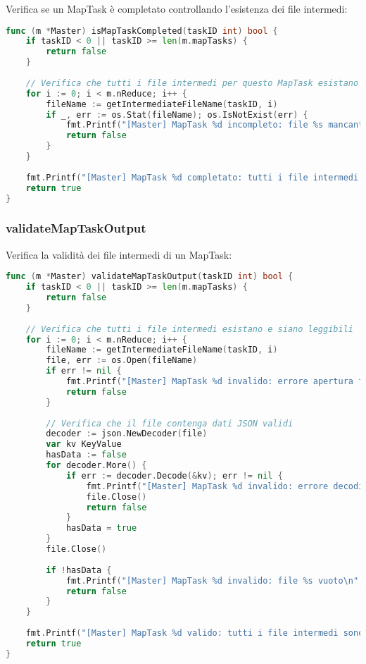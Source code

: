 \documentclass[12pt,a4paper]{article}
\begin{document}
Verifica se un MapTask è completato controllando l'esistenza dei file intermedi:

\begin{lstlisting}[language=go]
func (m *Master) isMapTaskCompleted(taskID int) bool {
    if taskID < 0 || taskID >= len(m.mapTasks) {
        return false
    }
    
    // Verifica che tutti i file intermedi per questo MapTask esistano
    for i := 0; i < m.nReduce; i++ {
        fileName := getIntermediateFileName(taskID, i)
        if _, err := os.Stat(fileName); os.IsNotExist(err) {
            fmt.Printf("[Master] MapTask %d incompleto: file %s mancante\n", taskID, fileName)
            return false
        }
    }
    
    fmt.Printf("[Master] MapTask %d completato: tutti i file intermedi presenti\n", taskID)
    return true
}
\end{lstlisting}

\subsubsection{validateMapTaskOutput}

Verifica la validità dei file intermedi di un MapTask:

\begin{lstlisting}[language=go]
func (m *Master) validateMapTaskOutput(taskID int) bool {
    if taskID < 0 || taskID >= len(m.mapTasks) {
        return false
    }
    
    // Verifica che tutti i file intermedi esistano e siano leggibili
    for i := 0; i < m.nReduce; i++ {
        fileName := getIntermediateFileName(taskID, i)
        file, err := os.Open(fileName)
        if err != nil {
            fmt.Printf("[Master] MapTask %d invalido: errore apertura file %s: %v\n", taskID, fileName, err)
            return false
        }
        
        // Verifica che il file contenga dati JSON validi
        decoder := json.NewDecoder(file)
        var kv KeyValue
        hasData := false
        for decoder.More() {
            if err := decoder.Decode(&kv); err != nil {
                fmt.Printf("[Master] MapTask %d invalido: errore decodifica JSON in %s: %v\n", taskID, fileName, err)
                file.Close()
                return false
            }
            hasData = true
        }
        file.Close()
        
        if !hasData {
            fmt.Printf("[Master] MapTask %d invalido: file %s vuoto\n", taskID, fileName)
            return false
        }
    }
    
    fmt.Printf("[Master] MapTask %d valido: tutti i file intermedi sono validi\n", taskID)
    return true
}
\end{lstlisting}
\end{document}
